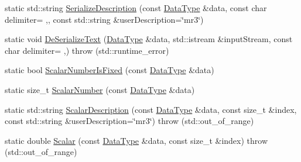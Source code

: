 \begin{DoxyCompactItemize}
\item 
static std\+::string \hyperlink{classcmn_data_3_01vct_matrix_rotation3_3_01__element_type_00_01__row_major_01_4_01_4_a1203341b573b8565de5f36b8f5ffd14c}{Serialize\+Description} (const \hyperlink{classcmn_data_3_01vct_matrix_rotation3_3_01__element_type_00_01__row_major_01_4_01_4_a16ee28dba714864959664e5a1567db82}{Data\+Type} \&data, const char delimiter= \textquotesingle{},\textquotesingle{}, const std\+::string \&user\+Description=\char`\"{}mr3\char`\"{})
\item 
static void \hyperlink{classcmn_data_3_01vct_matrix_rotation3_3_01__element_type_00_01__row_major_01_4_01_4_af0aca483edd80282f8e60d883d052037}{De\+Serialize\+Text} (\hyperlink{classcmn_data_3_01vct_matrix_rotation3_3_01__element_type_00_01__row_major_01_4_01_4_a16ee28dba714864959664e5a1567db82}{Data\+Type} \&data, std\+::istream \&input\+Stream, const char delimiter= \textquotesingle{},\textquotesingle{})  throw (std\+::runtime\+\_\+error)
\item 
static bool \hyperlink{classcmn_data_3_01vct_matrix_rotation3_3_01__element_type_00_01__row_major_01_4_01_4_aa91635f086f7f50f8a424fcaf5a12079}{Scalar\+Number\+Is\+Fixed} (const \hyperlink{classcmn_data_3_01vct_matrix_rotation3_3_01__element_type_00_01__row_major_01_4_01_4_a16ee28dba714864959664e5a1567db82}{Data\+Type} \&data)
\item 
static size\+\_\+t \hyperlink{classcmn_data_3_01vct_matrix_rotation3_3_01__element_type_00_01__row_major_01_4_01_4_a0d781f89f354970f859c33597779351a}{Scalar\+Number} (const \hyperlink{classcmn_data_3_01vct_matrix_rotation3_3_01__element_type_00_01__row_major_01_4_01_4_a16ee28dba714864959664e5a1567db82}{Data\+Type} \&data)
\item 
static std\+::string \hyperlink{classcmn_data_3_01vct_matrix_rotation3_3_01__element_type_00_01__row_major_01_4_01_4_a5ce32e2a7843e957663459ba7f4ce87d}{Scalar\+Description} (const \hyperlink{classcmn_data_3_01vct_matrix_rotation3_3_01__element_type_00_01__row_major_01_4_01_4_a16ee28dba714864959664e5a1567db82}{Data\+Type} \&data, const size\+\_\+t \&index, const std\+::string \&user\+Description=\char`\"{}mr3\char`\"{})  throw (std\+::out\+\_\+of\+\_\+range)
\item 
static double \hyperlink{classcmn_data_3_01vct_matrix_rotation3_3_01__element_type_00_01__row_major_01_4_01_4_ad4526b3237ba682a837dd146681f7f73}{Scalar} (const \hyperlink{classcmn_data_3_01vct_matrix_rotation3_3_01__element_type_00_01__row_major_01_4_01_4_a16ee28dba714864959664e5a1567db82}{Data\+Type} \&data, const size\+\_\+t \&index)  throw (std\+::out\+\_\+of\+\_\+range)
\end{DoxyCompactItemize}


